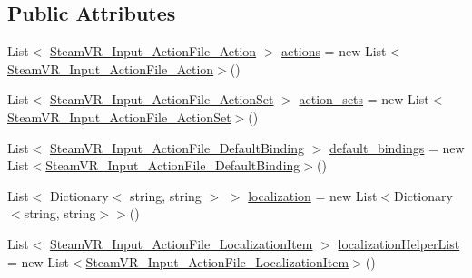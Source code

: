 \subsection*{Public Attributes}
\begin{DoxyCompactItemize}
\item 
List$<$ \mbox{\hyperlink{class_valve_1_1_v_r_1_1_steam_v_r___input___action_file___action}{Steam\+V\+R\+\_\+\+Input\+\_\+\+Action\+File\+\_\+\+Action}} $>$ \mbox{\hyperlink{class_valve_1_1_v_r_1_1_steam_v_r___input___action_file_ab324306dc9516ec2306947a22a2adcba}{actions}} = new List$<$\mbox{\hyperlink{class_valve_1_1_v_r_1_1_steam_v_r___input___action_file___action}{Steam\+V\+R\+\_\+\+Input\+\_\+\+Action\+File\+\_\+\+Action}}$>$()
\item 
List$<$ \mbox{\hyperlink{class_valve_1_1_v_r_1_1_steam_v_r___input___action_file___action_set}{Steam\+V\+R\+\_\+\+Input\+\_\+\+Action\+File\+\_\+\+Action\+Set}} $>$ \mbox{\hyperlink{class_valve_1_1_v_r_1_1_steam_v_r___input___action_file_a4a87ed8dd184895ed7b4117a60dd2589}{action\+\_\+sets}} = new List$<$\mbox{\hyperlink{class_valve_1_1_v_r_1_1_steam_v_r___input___action_file___action_set}{Steam\+V\+R\+\_\+\+Input\+\_\+\+Action\+File\+\_\+\+Action\+Set}}$>$()
\item 
List$<$ \mbox{\hyperlink{class_valve_1_1_v_r_1_1_steam_v_r___input___action_file___default_binding}{Steam\+V\+R\+\_\+\+Input\+\_\+\+Action\+File\+\_\+\+Default\+Binding}} $>$ \mbox{\hyperlink{class_valve_1_1_v_r_1_1_steam_v_r___input___action_file_ab24430cccd335b4f5e5d37b39d70cb86}{default\+\_\+bindings}} = new List$<$\mbox{\hyperlink{class_valve_1_1_v_r_1_1_steam_v_r___input___action_file___default_binding}{Steam\+V\+R\+\_\+\+Input\+\_\+\+Action\+File\+\_\+\+Default\+Binding}}$>$()
\item 
List$<$ Dictionary$<$ string, string $>$ $>$ \mbox{\hyperlink{class_valve_1_1_v_r_1_1_steam_v_r___input___action_file_af3d52acf4347b019cce1a503c994023c}{localization}} = new List$<$Dictionary$<$string, string$>$$>$()
\item 
List$<$ \mbox{\hyperlink{class_valve_1_1_v_r_1_1_steam_v_r___input___action_file___localization_item}{Steam\+V\+R\+\_\+\+Input\+\_\+\+Action\+File\+\_\+\+Localization\+Item}} $>$ \mbox{\hyperlink{class_valve_1_1_v_r_1_1_steam_v_r___input___action_file_a99c45fb1db534b6504c7b2f884a306da}{localization\+Helper\+List}} = new List$<$\mbox{\hyperlink{class_valve_1_1_v_r_1_1_steam_v_r___input___action_file___localization_item}{Steam\+V\+R\+\_\+\+Input\+\_\+\+Action\+File\+\_\+\+Localization\+Item}}$>$()
\end{DoxyCompactItemize}


